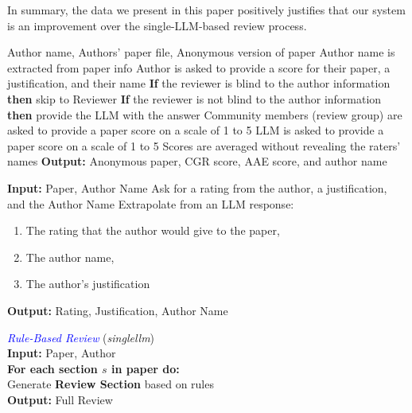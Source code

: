 \documentclass{article} %
\begin{document}
In summary, the data we present in this paper positively justifies that our system is an improvement over the single-LLM-based review process.

\begin{algorithm}[htb]
	\caption{Author-Assisted-Evaluation (AAE) and Community-Guided Review (CGR) of a paper}
	\begin{algorithmic}[1]
		 Author name, Authors' paper file, Anonymous version of paper
		\STATE Author name is extracted from paper info
		\STATE Author is asked to provide a score for their paper, a justification, and their name
		\STATE \textbf{If} the reviewer is blind to the author information \textbf{then} skip to Reviewer
        \STATE \textbf{If} the reviewer is not blind to the author information \textbf{then} provide the LLM with the answer
        \STATE Community members (review group) are asked to provide a paper score on a scale of 1 to 5
        \STATE LLM is asked to provide a paper score on a scale of 1 to 5
        \STATE Scores are averaged without revealing the raters' names
		\STATE \textbf{Output:} Anonymous paper, CGR score, AAE score, and author name
	\end{algorithmic}
	\label{alg:total}
\end{algorithm}

\begin{minipage}[t]{0.52\textwidth}
\begin{algorithmic}[1]
    \STATE \textbf{Input:} Paper, Author Name
    \STATE Ask for a rating from the author, a justification, and the Author Name
    \STATE Extrapolate from an LLM response:
    \begin{enumerate}
        \item The rating that the author would give to the paper,
        \item The author name,
        \item The author’s justification
    \end{enumerate}
    \STATE \textbf{Output:} Rating, Justification, Author Name
\end{algorithmic}
\label{alg:author-summarize}
\end{minipage}
\hfill
\begin{minipage}[t]{0.45\textwidth}
\textcolor{blue}{\textit{Rule-Based Review}} (\textit{singlellm}) \\[0.5em]
\textcolor{myyellow}{\textbf{Input:}} Paper, Author \\[0.3em]
\textbf{For each section $s$ in paper do:} \\
\quad Generate \textcolor{myyellow}{\textbf{Review Section}} based on rules \\[0.5em]
\textcolor{myyellow}{\textbf{Output:}} Full Review
\label{alg:single-llm}
\end{minipage}
\end{document}
